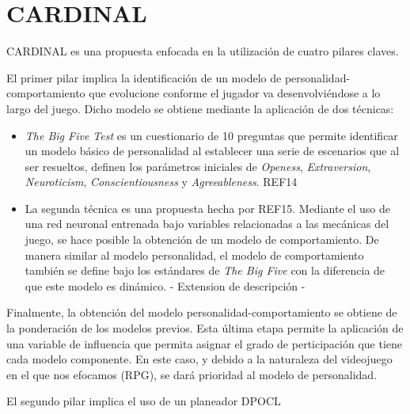 \chapter{CARDINAL}


CARDINAL es una propuesta enfocada en la utilización de cuatro pilares claves. 

El primer pilar implica la identificación de un modelo de personalidad-comportamiento que evolucione conforme el jugador va desenvolviéndose a lo largo del juego. Dicho modelo se obtiene mediante la aplicación de dos técnicas:
\begin{itemize}
\item \textit{The Big Five Test} es un cuestionario de 10 preguntas que permite identificar un modelo básico de personalidad al establecer una serie de escenarios que al ser resueltos, definen los parámetros iniciales de \textit{Openess}, \textit{Extraversion}, \textit{Neuroticism}, \textit{Conscientiousness} y \textit{Agreeableness}. REF14

\item La segunda técnica es una propuesta hecha por REF15. Mediante el uso de una red neuronal entrenada bajo variables relacionadas a las mecánicas del juego, se hace posible la obtención de un modelo de comportamiento. De manera similar al modelo personalidad, el modelo de comportamiento también se define bajo los estándares de \textit{The Big Five} con la diferencia de que este modelo es dinámico. - Extension de descripción -
\end{itemize}

Finalmente, la obtención del modelo personalidad-comportamiento se obtiene de la ponderación de los modelos previos. Esta última etapa permite la aplicación de una variable de influencia que permita asignar el grado de perticipación que tiene cada modelo componente. En este caso, y debido a la naturaleza del videojuego en el que nos efocamos (RPG), se dará prioridad al modelo de personalidad. 

El segundo pilar implica el uso de un planeador \ac{DPOCL}





